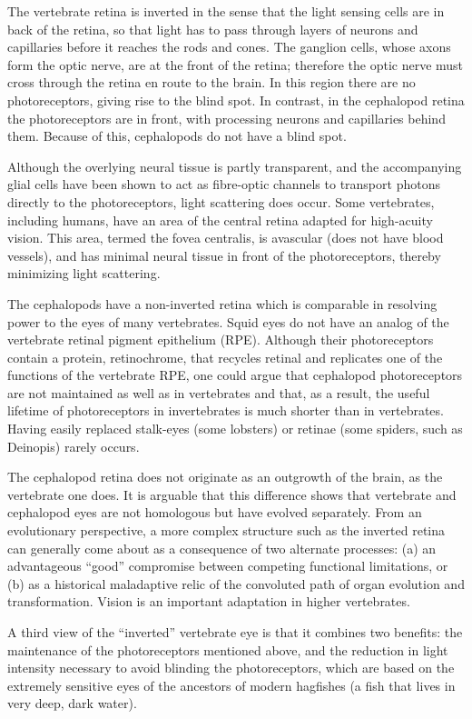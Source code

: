 The vertebrate retina is inverted in the sense that the light sensing cells are in back of the retina, so that light has to pass through layers of neurons and capillaries before it reaches the rods and cones. The ganglion cells, whose axons form the optic nerve, are at the front of the retina; therefore the optic nerve must cross through the retina en route to the brain. In this region there are no photoreceptors, giving rise to the blind spot. In contrast, in the cephalopod retina the photoreceptors are in front, with processing neurons and capillaries behind them. Because of this, cephalopods do not have a blind spot.

Although the overlying neural tissue is partly transparent, and the accompanying glial cells have been shown to act as fibre-optic channels to transport photons directly to the photoreceptors, light scattering does occur. Some vertebrates, including humans, have an area of the central retina adapted for high-acuity vision. This area, termed the fovea centralis, is avascular (does not have blood vessels), and has minimal neural tissue in front of the photoreceptors, thereby minimizing light scattering.

The cephalopods have a non-inverted retina which is comparable in resolving power to the eyes of many vertebrates. Squid eyes do not have an analog of the vertebrate retinal pigment epithelium (RPE). Although their photoreceptors contain a protein, retinochrome, that recycles retinal and replicates one of the functions of the vertebrate RPE, one could argue that cephalopod photoreceptors are not maintained as well as in vertebrates and that, as a result, the useful lifetime of photoreceptors in invertebrates is much shorter than in vertebrates. Having easily replaced stalk-eyes (some lobsters) or retinae (some spiders, such as Deinopis) rarely occurs.

The cephalopod retina does not originate as an outgrowth of the brain, as the vertebrate one does. It is arguable that this difference shows that vertebrate and cephalopod eyes are not homologous but have evolved separately. From an evolutionary perspective, a more complex structure such as the inverted retina can generally come about as a consequence of two alternate processes: (a) an advantageous ``good'' compromise between competing functional limitations, or (b) as a historical maladaptive relic of the convoluted path of organ evolution and transformation. Vision is an important adaptation in higher vertebrates.

A third view of the ``inverted'' vertebrate eye is that it combines two benefits: the maintenance of the photoreceptors mentioned above, and the reduction in light intensity necessary to avoid blinding the photoreceptors, which are based on the extremely sensitive eyes of the ancestors of modern hagfishes (a fish that lives in very deep, dark water).

